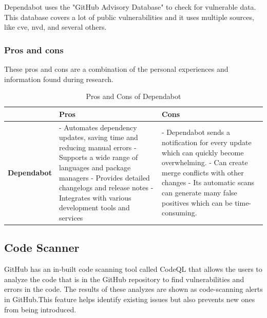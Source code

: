 Dependabot uses the "GitHub Advisory Database" to check for vulnerable data. This database covers a lot of public vulnerabilities and it uses multiple sources, like \acrlong{cve}, \acrlong{nvd}, and several others. \cite{GithubDependabot1}

\subsubsection{Pros and cons}
These pros and cons are a combination of the personal experiences and information found during research. \cite{prosconsdependabot} 

\begin{table}[H]
\centering
\begin{tabular}{|c|p{6cm}|p{6cm}|}
\hline
 & \textbf{Pros} & \textbf{Cons} \\
\hline
\textbf{Dependabot} & 
- Automates dependency updates, saving time and reducing manual errors \newline
- Supports a wide range of languages and package managers \newline
- Provides detailed changelogs and release notes \newline
- Integrates with various development tools and services &
- Dependabot sends a notification for every update which can quickly 
  become overwhelming. \newline
- Can create merge conflicts with other changes \newline
- Its automatic scans can generate many false positives which can be 
  time-consuming. \\
\hline
\end{tabular}
\caption{Pros and Cons of Dependabot}
\label{tab:dependabot}
\end{table}

\subsection{Code Scanner}
GitHub has an in-built code scanning tool called CodeQL that allows the users to analyze the code that is in the GitHub repository to find vulnerabilities and errors in the code. The results of these analyzes are shown as code-scanning alerts in GitHub.This feature helps identify existing issues but also prevents new ones from being introduced. \cite{CodeQL1}

